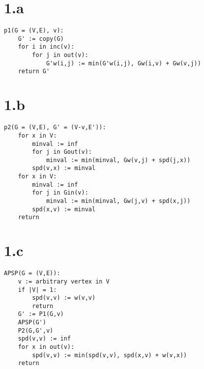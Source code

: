 \documentclass{article}
\begin{document}
\section*{1.a}

\begin{verbatim}
p1(G = (V,E), v):
    G' := copy(G)
    for i in inc(v):
        for j in out(v):
            G'w(i,j) := min(G'w(i,j), Gw(i,v) + Gw(v,j))
    return G'
\end{verbatim}

\section*{1.b}

\begin{verbatim}
p2(G = (V,E), G' = (V-v,E')):
    for x in V:
        minval := inf
        for j in Gout(v):
            minval := min(minval, Gw(v,j) + spd(j,x))
        spd(v,x) := minval
    for x in V:
        minval := inf
        for j in Gin(v):
            minval := min(minval, Gw(j,v) + spd(x,j))
        spd(x,v) := minval
    return
\end{verbatim}

\section*{1.c}

\begin{verbatim}
APSP(G = (V,E)):
    v := arbitrary vertex in V
    if |V| = 1:
        spd(v,v) := w(v,v)
        return
    G' := P1(G,v)
    APSP(G')
    P2(G,G',v)
    spd(v,v) := inf
    for x in out(v):
        spd(v,v) := min(spd(v,v), spd(x,v) + w(v,x))
    return 
\end{verbatim}
\end{document}
